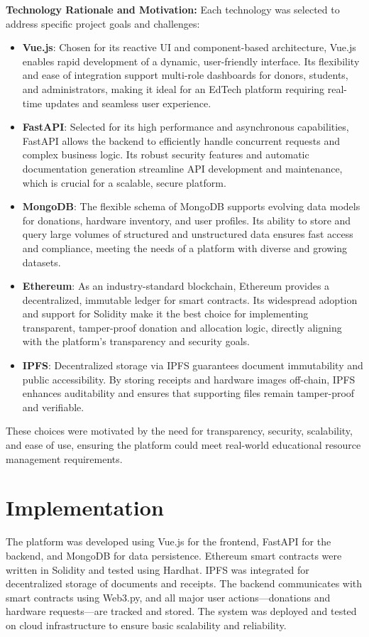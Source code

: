 \documentclass[a4paper,12pt]{report}
\begin{document}
\textbf{Technology Rationale and Motivation:}
Each technology was selected to address specific project goals and challenges:
\begin{itemize}
    \item \textbf{Vue.js}: Chosen for its reactive UI and component-based architecture, Vue.js enables rapid development of a dynamic, user-friendly interface. Its flexibility and ease of integration support multi-role dashboards for donors, students, and administrators, making it ideal for an EdTech platform requiring real-time updates and seamless user experience.
    \item \textbf{FastAPI}: Selected for its high performance and asynchronous capabilities, FastAPI allows the backend to efficiently handle concurrent requests and complex business logic. Its robust security features and automatic documentation generation streamline API development and maintenance, which is crucial for a scalable, secure platform.
    \item \textbf{MongoDB}: The flexible schema of MongoDB supports evolving data models for donations, hardware inventory, and user profiles. Its ability to store and query large volumes of structured and unstructured data ensures fast access and compliance, meeting the needs of a platform with diverse and growing datasets.
    \item \textbf{Ethereum}: As an industry-standard blockchain, Ethereum provides a decentralized, immutable ledger for smart contracts. Its widespread adoption and support for Solidity make it the best choice for implementing transparent, tamper-proof donation and allocation logic, directly aligning with the platform’s transparency and security goals.
    \item \textbf{IPFS}: Decentralized storage via IPFS guarantees document immutability and public accessibility. By storing receipts and hardware images off-chain, IPFS enhances auditability and ensures that supporting files remain tamper-proof and verifiable.
\end{itemize}
These choices were motivated by the need for transparency, security, scalability, and ease of use, ensuring the platform could meet real-world educational resource management requirements.

\section{Implementation}
The platform was developed using Vue.js for the frontend, FastAPI for the backend, and MongoDB for data persistence. Ethereum smart contracts were written in Solidity and tested using Hardhat. IPFS was integrated for decentralized storage of documents and receipts. The backend communicates with smart contracts using Web3.py, and all major user actions—donations and hardware requests—are tracked and stored. The system was deployed and tested on cloud infrastructure to ensure basic scalability and reliability.
\end{document}
